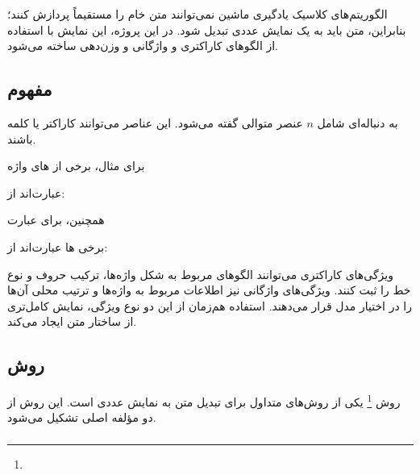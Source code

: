 الگوریتم‌های کلاسیک یادگیری ماشین نمی‌توانند متن خام را مستقیماً پردازش کنند؛ بنابراین، متن باید به یک نمایش عددی تبدیل شود. در این پروژه، این نمایش با استفاده از الگوهای کاراکتری و واژگانی و وزن‌دهی
ساخته می‌شود.


\subsection{مفهوم }

به دنباله‌ای شامل $n$ عنصر متوالی گفته می‌شود. این عناصر می‌توانند کاراکتر یا کلمه باشند.

برای مثال، برخی از
های واژه

\begin{center}
\end{center}

عبارت‌اند از:

\begin{center}
\end{center}

همچنین، برای عبارت

\begin{center}
\end{center}

برخی
ها عبارت‌اند از:

\begin{center}
\end{center}

ویژگی‌های کاراکتری می‌توانند الگوهای مربوط به شکل واژه‌ها، ترکیب حروف و نوع خط را ثبت کنند. ویژگی‌های واژگانی نیز اطلاعات مربوط به واژه‌ها و ترتیب محلی آن‌ها را در اختیار مدل قرار می‌دهند. استفاده هم‌زمان از این دو نوع ویژگی، نمایش کامل‌تری از ساختار متن ایجاد می‌کند.


\subsection{روش }

روش
\footnote{}
یکی از روش‌های متداول برای تبدیل متن به نمایش عددی است. این روش از دو مؤلفه اصلی تشکیل می‌شود.


\subsubsection{}

